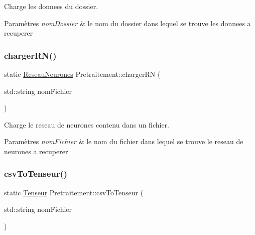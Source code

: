 Charge les donnees du dossier. 


\begin{DoxyParams}{Paramètres}
{\em nom\+Dossier} & le nom du dossier dans lequel se trouve les donnees a recuperer \\
\hline
\end{DoxyParams}
\mbox{\label{classPretraitement_a2d1e9cdbe1b865565f63c435923ec8e3}} 
\subsubsection{\texorpdfstring{charger\+R\+N()}{chargerRN()}}
{\footnotesize\ttfamily static \hyperlink{classReseauNeurones}{Reseau\+Neurones} Pretraitement\+::charger\+RN (\begin{DoxyParamCaption}\item[{std\+::string}]{nom\+Fichier }\end{DoxyParamCaption})\hspace{0.3cm}{\ttfamily [static]}}



Charge le reseau de neurones contenu dans un fichier. 


\begin{DoxyParams}{Paramètres}
{\em nom\+Fichier} & le nom du fichier dans lequel se trouve le reseau de neurones a recuperer \\
\hline
\end{DoxyParams}
\mbox{\label{classPretraitement_a588810b1b86e11464cea64443358ae5a}} 
\subsubsection{\texorpdfstring{csv\+To\+Tenseur()}{csvToTenseur()}}
{\footnotesize\ttfamily static \hyperlink{classTenseur}{Tenseur} Pretraitement\+::csv\+To\+Tenseur (\begin{DoxyParamCaption}\item[{std\+::string}]{nom\+Fichier }\end{DoxyParamCaption})\hspace{0.3cm}{\ttfamily [static]}}



